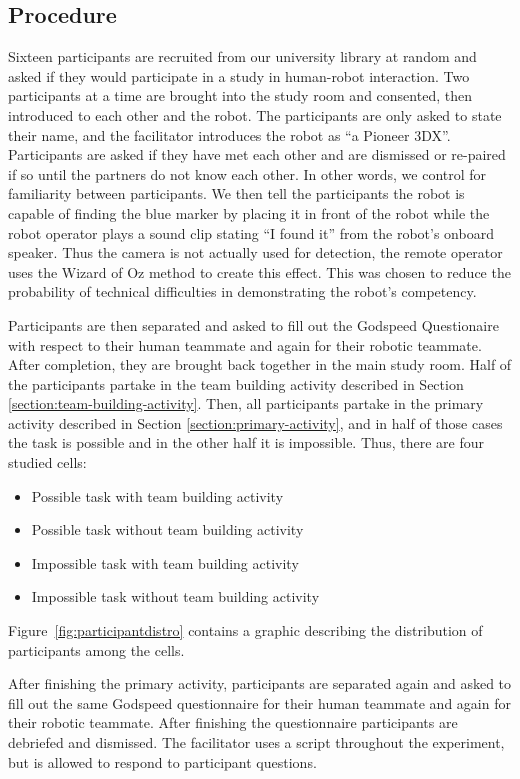 \documentclass{acm_proc_article-sp}
\begin{document}
\subsection{Procedure}
Sixteen participants are recruited from our university library at random and asked if they would participate in a study in human-robot interaction. Two participants at a time are brought into the study room and consented, then introduced to each other and the robot. The participants are only asked to state their name, and the facilitator introduces the robot as ``a Pioneer 3DX''. Participants are asked if they have met each other and are dismissed or re-paired if so until the partners do not know each other. In other words, we control for familiarity between participants. We then tell the participants the robot is capable of finding the blue marker by placing it in front of the robot while the robot operator plays a sound clip stating ``I found it'' from the robot's onboard speaker. Thus the camera is not actually used for detection, the remote operator uses the Wizard of Oz method to create this effect. This was chosen to reduce the probability of technical difficulties in demonstrating the robot's competency.

Participants are then separated and asked to fill out the Godspeed Questionaire \cite{Godspeed} with respect to their human teammate and again for their robotic teammate. After completion, they are brought back together in the main study room.
Half of the participants partake in the team building activity described in Section \ref{section:team-building-activity}. Then, all participants partake in the primary activity described in Section \ref{section:primary-activity}, and in half of those cases the task is possible and in the other half it is impossible. Thus, there are four studied cells:
\begin{itemize}
 \item Possible task with team building activity
 \item Possible task without team building activity
 \item Impossible task with team building activity
 \item Impossible task without team building activity
\end{itemize}

Figure~\ref{fig:participantdistro} contains a graphic describing the distribution of participants among the cells. 

After finishing the primary activity, participants are separated again and asked to fill out the same Godspeed questionnaire for their human teammate and again for their robotic teammate. After finishing the questionnaire participants are debriefed and dismissed. The facilitator uses a script throughout the experiment, but is allowed to respond to participant questions. 
\end{document}
